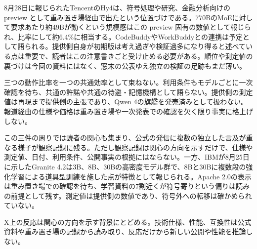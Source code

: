 8月28日に報じられたTencentのHy4は、符号処理や研究、金融分析向けの preview として重み置き場経由で出たという位置づけである\cite{hy4preview}。770BのMoEに対して要求あたり約49Bが動くという規模感はこの preview 固有の数値として報じられ、比率にして約6.4\%に相当する。CodeBuddyやWorkBuddyとの連携は予定として語られる。提供側自身が初期版は考え過ぎや検証過多になり得ると述べている点は重要で、読者はこの注意書きごと受け止める必要がある。順位や測定値の裏づけは今回の資料にはなく、窓末の公表ゆえ独立の検証の足跡もまだ薄い。

\begin{claimboundary}[未解決の境界]
三つの動作比率を一つの共通効率として束ねない。利用条件もモデルごとに一次確認を待ち、共通の許諾や共通の待避・記憶機構として語らない。提供側の測定値は再現まで提供側の主張であり、Qwen 4の旗艦を発売済みとして扱わない。報道経由の仕様や価格は重み置き場や一次発表での確認を欠く限り事実に格上げしない。
\end{claimboundary}

この三件の周りでは読者の関心も集まり、公式の発信に複数の独立した言及が重なる様子が観察記録に残る\cite{w35community}。ただし観察記録は関心の方向を示すだけで、仕様や測定値、日付、利用条件、公開事実の根拠にはならない。一方、IBMが8月25日に示したGranite 4.2は3B、8B、30Bの高密度モデル群で、8Bと30Bに複数段の強化学習による道具型訓練を施した点が特徴として報じられる\cite{granite42}。Apache 2.0の表示は重み置き場での確認を待ち、学習資料の7割近くが符号寄りという偏りは読みの前提として残す。測定値は提供側の数値であり、符号外への転移は確かめられていない。

\begin{technicalnote}[公開情報の境界]
X上の反応は関心の方向を示す背景にとどめる。技術仕様、性能、互換性は公式資料や重み置き場の記録から読み取り、反応だけから新しい公開や性能を推論しない\cite{w35community}。
\end{technicalnote}
